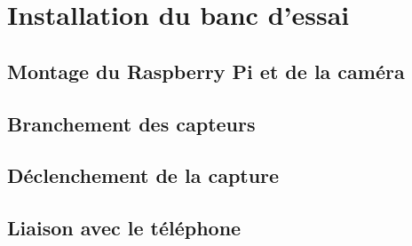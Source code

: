 
\section{Installation du banc d'essai}


\subsection{Montage du Raspberry Pi et de la caméra}

\subsection{Branchement des capteurs}

\subsection{Déclenchement de la capture}

\subsection{Liaison avec le téléphone}

